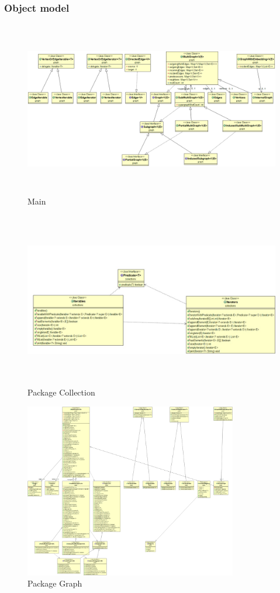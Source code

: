\documentclass[a4paper,10pt]{article}
\begin{document}
\subsubsection{Object model}
\begin{figure}[H]
		\centering
		\includegraphics[height = 3in]{1main.png}
		\caption[Optional caption]{Main}
		\label{fig:1main}
	\end{figure}
	
	\begin{figure}[H]
		\centering
		\includegraphics[height = 3in]{f3_edit.jpg}
		\caption[Optional caption]{Package Collection}
		\label{fig:1main}
	\end{figure}
	
	\begin{figure}[H]
		\centering
		\includegraphics[height = 3in]{3packagegraph.png}
		\caption[Optional caption]{Package Graph}
		\label{fig:1main}
	\end{figure}
	
\end{document}
